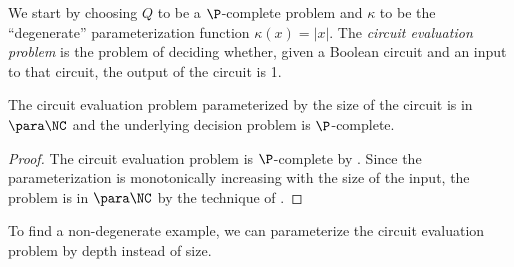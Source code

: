 We start by choosing $Q$ to be a $\P$-complete problem and $\kappa$ to be the ``degenerate'' parameterization function $\kappa(x) = |x|$.
The \emph{circuit evaluation problem} is the problem of deciding whether, given a Boolean circuit and an input to that circuit, the output of the circuit is 1.


\begin{theorem}\label{thm:degen}
  The circuit evaluation problem parameterized by the size of the circuit is in $\para \NC$ and the underlying decision problem is $\P$-complete.
\end{theorem}
\begin{proof}
  The circuit evaluation problem is $\P$-complete by \autocite{ladner75}.
  Since the parameterization is monotonically increasing with the size of the input, the problem is in $\para \NC$ by the technique of \autocite[Proposition~1.7]{fg06}.
\end{proof}

To find a non-degenerate example, we can parameterize the circuit evaluation problem by depth instead of size.


